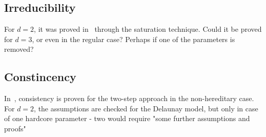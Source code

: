 \documentclass[12pt,a4paper]{report}
\begin{document}
\subsection{Irreducibility}
For $d=2$, it was proved in~\cite{DL10} through the saturation technique. Could it be proved for $d=3$, or even in the regular case? Perhaps if one of the parameters is removed?
\subsection{Constincency}
In~\cite{DL07}, consistency is proven for the two-step approach in the non-hereditary case. For $d=2$, the assumptions are checked for the Delaunay model, but only in case of one hardcore parameter - two would require "some further assumptions and proofs"
\end{document}

